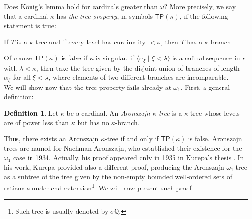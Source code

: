 \documentclass[11pt,a4paper]{report}
\theoremstyle{definition}
\newtheorem{defn}[theorem]{Definition}
\theoremstyle{num.custom-title}
\theoremstyle{custom-title}
\newcommand{\TP}{\ensuremath{\mathsf{TP}}\xspace}
\newcommand{\Q}{\mathbb{Q}}
\begin{document}
Does König's lemma hold for cardinals greater than $\omega$? More precisely, we say that a cardinal $\kappa$ has \emph{the tree property}, in symbols $\TP(\kappa)$, if the following statement is true:
\begin{center}
If $T$ is a $\kappa$-tree and if every level has cardinality $<\kappa$, then $T$ has a $\kappa$-branch.
\end{center}
%
Of course $\TP(\kappa)$ is false if $\kappa$ is singular: if $\langle \alpha_\xi \mid \xi < \lambda \rangle$ is a cofinal sequence in $\kappa$ with $\lambda < \kappa$, then take the tree given by the disjoint union of branches of length $\alpha_\xi$ for all $\xi < \lambda$, where elements of two different branches are incomparable.\\
We will show now that the tree property fails already at $\omega_1$. First, a general definition:

\begin{defn}
Let $\kappa$ be a cardinal. An \emph{Aronszajn $\kappa$-tree} is a $\kappa$-tree whose levels are of power less than $\kappa$ but has no $\kappa$-branch.
\end{defn}
%
Thus, there exists an Aronszajn $\kappa$-tree if and only if $\TP(\kappa)$ is false. Aronszajn trees are named for Nachman Aronszajn, who established their existence for the $\omega_1$ case in 1934. Actually, his proof appeared only in 1935 in Kurepa's thesis \cite{Kur1935}. In his work, Kurepa provided also a different proof, producing the Aronszajn $\omega_1$-tree as a subtree of the tree given by the non-empty bounded well-ordered sets of rationals under end-extension\footnote{Such tree is usually denoted by $\sigma \Q$.}. We will now present such proof.
\end{document}

